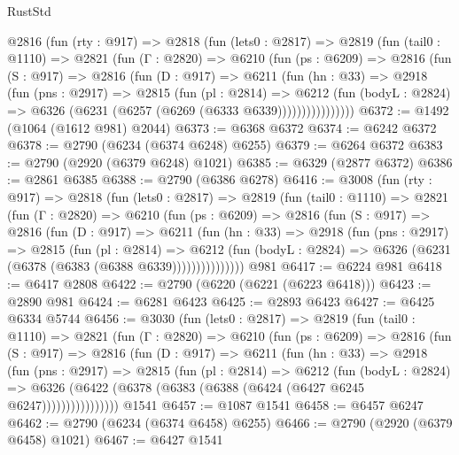 \begin{lexlean}{RustStd}
\begin{coremodule}
{\begin{coremodule}
{{{{{{{{{{{{{{{{{{{{{{{{{{    @2816
      (fun (rty : @917) =>
      @2818
        (fun (lets0 : @2817) =>
        @2819
          (fun (tail0 : @1110) =>
          @2821
            (fun (Γ : @2820) =>
            @6210
              (fun (ps : @6209) =>
              @2816
                (fun (S : @917) =>
                @2816
                  (fun (D : @917) =>
                  @6211
                    (fun (hn : @33) =>
                    @2918
                      (fun (pns : @2917) =>
                      @2815
                        (fun (pl : @2814) =>
                        @6212
                          (fun (bodyL : @2824) =>
                          @6326 (@6231 (@6257 (@6269 (@6333 @6339))))))))))))))))
@6372 := @1492 (@1064 (@1612 @981) @2044)
@6373 := @6368 @6372
@6374 := @6242 @6372
@6378 := @2790 (@6234 (@6374 @6248) @6255)
@6379 := @6264 @6372
@6383 := @2790 (@2920 (@6379 @6248) @1021)
@6385 := @6329 (@2877 @6372)
@6386 := @2861 @6385
@6388 := @2790 (@6386 @6278)
@6416 := @3008
    (fun (rty : @917) =>
    @2818
      (fun (lets0 : @2817) =>
      @2819
        (fun (tail0 : @1110) =>
        @2821
          (fun (Γ : @2820) =>
          @6210
            (fun (ps : @6209) =>
            @2816
              (fun (S : @917) =>
              @2816
                (fun (D : @917) =>
                @6211
                  (fun (hn : @33) =>
                  @2918
                    (fun (pns : @2917) =>
                    @2815
                      (fun (pl : @2814) =>
                      @6212
                        (fun (bodyL : @2824) =>
                        @6326 (@6231 (@6378 (@6383 (@6388 @6339)))))))))))))))
    @981
@6417 := @6224 @981
@6418 := @6417 @2808
@6422 := @2790 (@6220 (@6221 (@6223 @6418)))
@6423 := @2890 @981
@6424 := @6281 @6423
@6425 := @2893 @6423
@6427 := @6425 @6334 @5744
@6456 := @3030
    (fun (lets0 : @2817) =>
    @2819
      (fun (tail0 : @1110) =>
      @2821
        (fun (Γ : @2820) =>
        @6210
          (fun (ps : @6209) =>
          @2816
            (fun (S : @917) =>
            @2816
              (fun (D : @917) =>
              @6211
                (fun (hn : @33) =>
                @2918
                  (fun (pns : @2917) =>
                  @2815
                    (fun (pl : @2814) =>
                    @6212
                      (fun (bodyL : @2824) =>
                      @6326 (@6422 (@6378 (@6383 (@6388 (@6424 (@6427 @6245 @6247))))))))))))))))
    @1541
@6457 := @1087 @1541
@6458 := @6457 @6247
@6462 := @2790 (@6234 (@6374 @6458) @6255)
@6466 := @2790 (@2920 (@6379 @6458) @1021)
@6467 := @6427 @1541
}}}}}}}}}}}}}}}}}}}}}}}}}}
\end{coremodule}}
\end{coremodule}
\end{lexlean}
